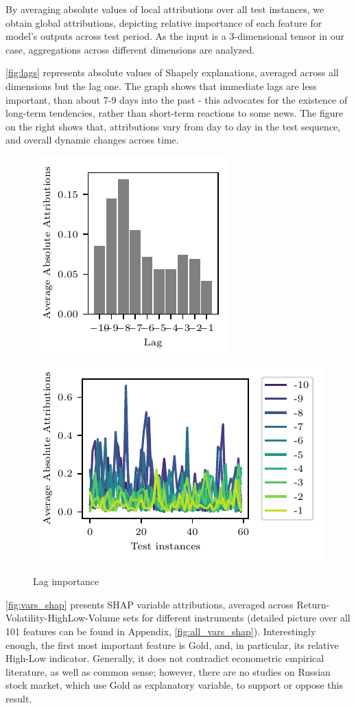 \documentclass[review, authoryear]{elsarticle}
\begin{document}
By averaging absolute values of local attributions over all test instances, we  obtain global attributions, depicting relative importance of each feature for model's outputs across test period. As the input is a 3-dimensional tensor in our case, aggregations across different dimensions are analyzed.

\autoref{fig:lags} represents absolute values of Shapely explanations, averaged across all dimensions but the lag one. The graph shows that immediate lags are less important, than about 7-9 days into the past - this advocates for the existence of long-term tendencies, rather than short-term reactions to some news. The figure on the right shows that, attributions vary from day to day in the test sequence, and overall dynamic changes across time.

\begin{figure}
    \centering
    \includegraphics{lags.pdf}
    \includegraphics{lags_series.pdf}
    \caption{Lag importance}
    \label{fig:lags}
\end{figure}

\autoref{fig:vars_shap} presents SHAP variable attributions, averaged across Return-Volatility-HighLow-Volume sets for different instruments (detailed picture over all 101 features can be found in Appendix, \autoref{fig:all_vars_shap}). Interestingly enough, the first most important feature is Gold, and, in particular, its relative High-Low indicator. Generally, it does not contradict econometric empirical literature, as well as common sense; however, there are no studies on Russian stock market, which use Gold as explanatory variable, to support or oppose this result.
\end{document}
